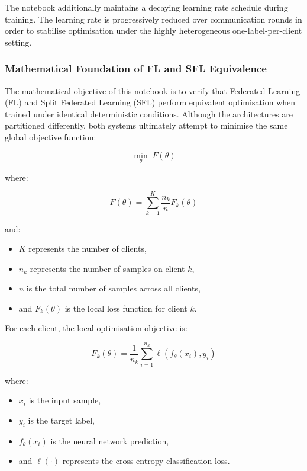The notebook additionally maintains a decaying learning rate schedule during training. The learning rate is progressively reduced over communication rounds in order to stabilise optimisation under the highly heterogeneous one-label-per-client setting.

\vspace{0.3cm}

\subsubsection*{Mathematical Foundation of FL and SFL Equivalence}

The mathematical objective of this notebook is to verify that Federated Learning (FL) and Split Federated Learning (SFL) perform equivalent optimisation when trained under identical deterministic conditions. Although the architectures are partitioned differently, both systems ultimately attempt to minimise the same global objective function:

\[
\min_{\theta} \; F(\theta)
\]

where:

\[
F(\theta) = \sum_{k=1}^{K} \frac{n_k}{n} F_k(\theta)
\]

and:

\begin{itemize}
    \item $K$ represents the number of clients,
    \item $n_k$ represents the number of samples on client $k$,
    \item $n$ is the total number of samples across all clients,
    \item and $F_k(\theta)$ is the local loss function for client $k$.
\end{itemize}

For each client, the local optimisation objective is:

\[
F_k(\theta)
=
\frac{1}{n_k}
\sum_{i=1}^{n_k}
\ell(f_{\theta}(x_i), y_i)
\]

where:
\begin{itemize}
    \item $x_i$ is the input sample,
    \item $y_i$ is the target label,
    \item $f_{\theta}(x_i)$ is the neural network prediction,
    \item and $\ell(\cdot)$ represents the cross-entropy classification loss.
\end{itemize}

